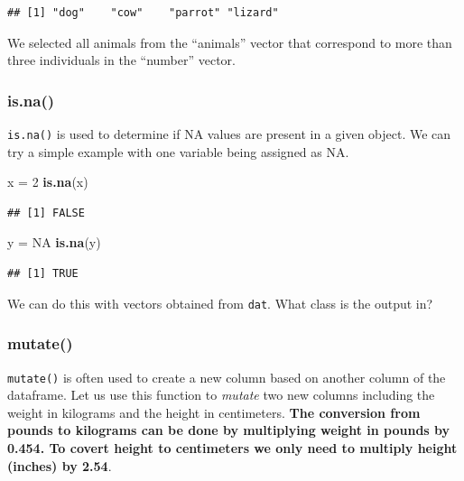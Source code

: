\documentclass[
]{book}
\newenvironment{Shaded}{\begin{snugshade}}{\end{snugshade}}
\newcommand{\ConstantTok}[1]{\textcolor[rgb]{0.56,0.35,0.01}{#1}}
\newcommand{\DecValTok}[1]{\textcolor[rgb]{0.00,0.00,0.81}{#1}}
\newcommand{\FunctionTok}[1]{\textcolor[rgb]{0.13,0.29,0.53}{\textbf{#1}}}
\newcommand{\NormalTok}[1]{#1}
\newcommand{\OtherTok}[1]{\textcolor[rgb]{0.56,0.35,0.01}{#1}}
\newcommand{\SpecialCharTok}[1]{\textcolor[rgb]{0.81,0.36,0.00}{\textbf{#1}}}
\begin{document}
\begin{verbatim}
## [1] "dog"    "cow"    "parrot" "lizard"
\end{verbatim}

We selected all animals from the ``animals'' vector that correspond to more than three individuals in the ``number'' vector.

\hypertarget{is.na}{%
\subsubsection{is.na()}\label{is.na}}

\texttt{is.na()} is used to determine if NA values are present in a given object. We can try a simple example with one variable being assigned as NA.

\begin{Shaded}
\begin{Highlighting}[]
\NormalTok{x }\OtherTok{=} \DecValTok{2}
\FunctionTok{is.na}\NormalTok{(x)}
\end{Highlighting}
\end{Shaded}

\begin{verbatim}
## [1] FALSE
\end{verbatim}

\begin{Shaded}
\begin{Highlighting}[]
\NormalTok{y }\OtherTok{=} \ConstantTok{NA}
\FunctionTok{is.na}\NormalTok{(y)}
\end{Highlighting}
\end{Shaded}

\begin{verbatim}
## [1] TRUE
\end{verbatim}

We can do this with vectors obtained from \texttt{dat}. What class is the output in?

\begin{Shaded}
\end{Shaded}

\hypertarget{mutate}{%
\subsubsection{mutate()}\label{mutate}}

\texttt{mutate()} is often used to create a new column based on another column of the dataframe. Let us use this function to \emph{mutate} two new columns including the weight in kilograms and the height in centimeters. \textbf{The conversion from pounds to kilograms can be done by multiplying weight in pounds by 0.454. To covert height to centimeters we only need to multiply height (inches) by 2.54}.
\end{document}
